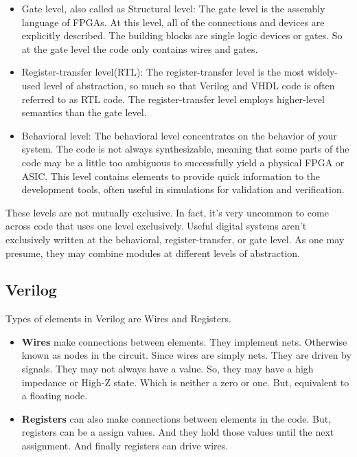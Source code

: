 \begin{itemize}
	\item Gate level, also called as Structural level: The gate level is the assembly language of FPGAs. At this level, all of the connections and devices are explicitly described. The building blocks are single logic devices or gates. So at the gate level the code only contains wires and gates.
	\item Register-transfer level(RTL): The register-transfer level is the most widely-used level of abstraction, so much so that Verilog and VHDL code is often referred to as RTL code. The register-transfer level employs higher-level semantics than the gate level.
	\item Behavioral level: The behavioral level concentrates on the behavior of your system. The code is not always synthesizable, meaning that some parts of the code may be a little too ambiguous to successfully yield a physical FPGA or ASIC. This level contains elements to provide quick information to the development tools, often useful in simulations for validation and verification.
\end{itemize} 
	
These levels are not mutually exclusive. In fact, it's very uncommon to come across code that uses one level exclusively. Useful digital systems aren't exclusively written at the behavioral, register-transfer, or gate level. As one may presume, they may combine modules at different levels of abstraction. 



\iffalse
\subsection{Verilog}
Types of elements in Verilog are Wires and Registers.
\begin{itemize}
	\item \textbf{Wires} make connections between elements. They implement nets. Otherwise known as nodes in the circuit. Since wires are simply nets. They are driven by signals. They may not always have a value. So, they may have a high impedance or High-Z state. Which is neither a zero or one. But, equivalent to a floating node. 
	\item \textbf{Registers} can also make connections between elements in the code. But, registers can be a assign values. And they hold those values until the next assignment. And finally registers can drive wires. 
\end{itemize} 
	

